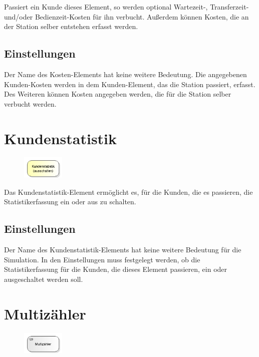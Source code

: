 Passiert ein Kunde dieses Element, so werden optional Wartezeit-, Transferzeit- und/oder Bedienzeit-Kosten für ihn
verbucht. Außerdem können Kosten, die an der Station selber entstehen erfasst werden.

\subsection*{Einstellungen}

Der Name des Kosten-Elements hat keine weitere Bedeutung. Die angegebenen Kunden-Kosten werden in dem Kunden-Element,
das die Station passiert, erfasst. Des Weiteren können Kosten angegeben werden, die für die Station selber verbucht
werden.


\section{Kundenstatistik}
\label{ref:ModelElementSetStatisticsMode}

\begin{figure}
\vspace{-22pt}
\includegraphics[width=2cm]{imageModelElementSetStatisticsMode.png}
\vspace{-22pt}
\end{figure}

Das Kundenstatistik-Element ermöglicht es, für die Kunden, die es passieren,
die Statistikerfassung ein oder aus zu schalten.

\subsection*{Einstellungen}

Der Name des Kundenstatistik-Elements hat keine weitere Bedeutung für die Simulation.
In den Einstellungen muss festgelegt werden, ob die Statistikerfassung für die Kunden,
die dieses Element passieren, ein oder ausgeschaltet werden soll.


\section{Multizähler}
\label{ref:ModelElementCounterMulti}

\begin{figure}
\vspace{-22pt}
\includegraphics[width=2cm]{imageModelElementCounterMulti.png}
\vspace{-22pt}
\end{figure}

